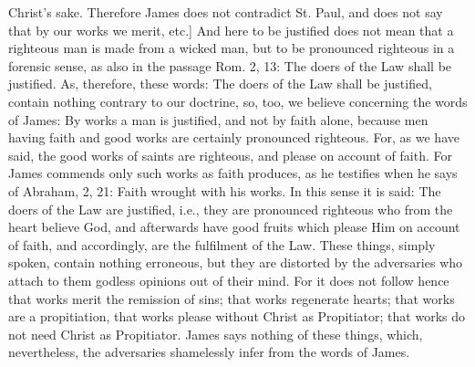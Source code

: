 Christ's sake.  Therefore James does not contradict St. Paul, and
does not say that by our works we merit, etc.] And here to be
justified does not mean that a righteous man is made from a wicked
man, but to be pronounced righteous in a forensic sense, as also in
the passage Rom. 2, 13: The doers of the Law shall be justified.  As,
therefore, these words: The doers of the Law shall be justified,
contain nothing contrary to our doctrine, so, too, we believe
concerning the words of James: By works a man is justified, and not
by faith alone, because men having faith and good works are certainly
pronounced righteous.  For, as we have said, the good works of saints
are righteous, and please on account of faith.  For James commends
only such works as faith produces, as he testifies when he says of
Abraham, 2, 21: Faith wrought with his works.  In this sense it is
said: The doers of the Law are justified, i.e., they are pronounced
righteous who from the heart believe God, and afterwards have good
fruits which please Him on account of faith, and accordingly, are the
fulfilment of the Law.  These things, simply spoken, contain nothing
erroneous, but they are distorted by the adversaries who attach to
them godless opinions out of their mind.  For it does not follow
hence that works merit the remission of sins; that works regenerate
hearts; that works are a propitiation, that works please without
Christ as Propitiator; that works do not need Christ as Propitiator.
James says nothing of these things, which, nevertheless, the
adversaries shamelessly infer from the words of James.

